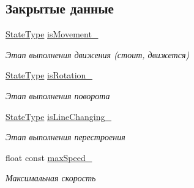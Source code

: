 \subsection*{Закрытые данные}
\begin{DoxyCompactItemize}
\item 
\mbox{\label{classrtm_1_1_vehicle_object_a2428e286d3d4b343aa08d7511621a80e}} 
\hyperlink{namespacertm_a11aeba1786456e9bc054ffe33b454181}{State\+Type} \hyperlink{classrtm_1_1_vehicle_object_a2428e286d3d4b343aa08d7511621a80e}{is\+Movement\+\_\+}
\begin{DoxyCompactList}\small\item\em Этап выполнения движения (стоит, движется) \end{DoxyCompactList}\item 
\mbox{\label{classrtm_1_1_vehicle_object_a0ffcd2c459f9e9e254fceb9dbf9f92ec}} 
\hyperlink{namespacertm_a11aeba1786456e9bc054ffe33b454181}{State\+Type} \hyperlink{classrtm_1_1_vehicle_object_a0ffcd2c459f9e9e254fceb9dbf9f92ec}{is\+Rotation\+\_\+}
\begin{DoxyCompactList}\small\item\em Этап выполнения поворота \end{DoxyCompactList}\item 
\mbox{\label{classrtm_1_1_vehicle_object_a9414b0c9f1e9efb64e1a0e3d7799645d}} 
\hyperlink{namespacertm_a11aeba1786456e9bc054ffe33b454181}{State\+Type} \hyperlink{classrtm_1_1_vehicle_object_a9414b0c9f1e9efb64e1a0e3d7799645d}{is\+Line\+Changing\+\_\+}
\begin{DoxyCompactList}\small\item\em Этап выполнения перестроения \end{DoxyCompactList}\item 
\mbox{\label{classrtm_1_1_vehicle_object_a364a6f04fee0079d3300c8aebb3e6b05}} 
float const \hyperlink{classrtm_1_1_vehicle_object_a364a6f04fee0079d3300c8aebb3e6b05}{max\+Speed\+\_\+}
\begin{DoxyCompactList}\small\item\em Максимальная скорость \end{DoxyCompactList}\item 
\mbox{\label{classrtm_1_1_vehicle_object_a8415f32ef87c65c05046f8e02da02dd5}} 

\end{DoxyCompactItemize}
